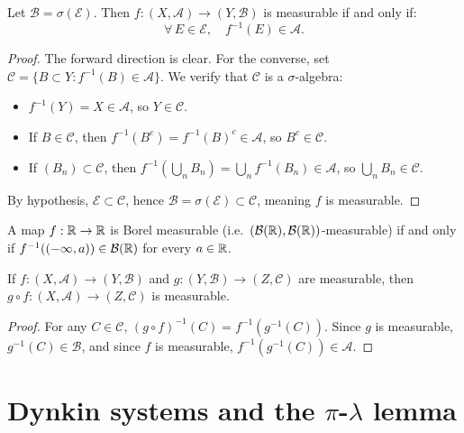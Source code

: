 \begin{proposition}
\label{prop:measurability_criterion}
Let $\mathcal{B} = \sigma(\mathcal{E})$. Then $f : (X, \mathcal{A}) \to
(Y, \mathcal{B})$ is measurable if and only if:
\[
\forall\, E \in \mathcal{E}, \quad f^{-1}(E) \in \mathcal{A}.
\]
\end{proposition}

\begin{proof}
The forward direction is clear. For the converse, set
$\mathcal{C} = \{B \subset Y : f^{-1}(B) \in \mathcal{A}\}$.
We verify that $\mathcal{C}$ is a $\sigma$-algebra:
\begin{itemize}
    \item $f^{-1}(Y) = X \in \mathcal{A}$, so $Y \in \mathcal{C}$.
    \item If $B \in \mathcal{C}$, then $f^{-1}(B^c) = f^{-1}(B)^c \in \mathcal{A}$,
    so $B^c \in \mathcal{C}$.
    \item If $(B_n) \subset \mathcal{C}$, then
    $f^{-1}(\bigcup_n B_n) = \bigcup_n f^{-1}(B_n) \in \mathcal{A}$, so
    $\bigcup_n B_n \in \mathcal{C}$.
\end{itemize}
By hypothesis, $\mathcal{E} \subset \mathcal{C}$, hence
$\mathcal{B} = \sigma(\mathcal{E}) \subset \mathcal{C}$, meaning $f$ is measurable.
\end{proof}

\begin{corollary}
A map $f : \mathbb{R} \to \mathbb{R}$ is Borel measurable (i.e.\
$(\mathcal{B}(\mathbb{R}), \mathcal{B}(\mathbb{R}))$-measurable) if and only if
$f^{-1}((-\infty, a)) \in \mathcal{B}(\mathbb{R})$ for every $a \in \mathbb{R}$.
\end{corollary}

\begin{proposition}[Composition]
If $f : (X, \mathcal{A}) \to (Y, \mathcal{B})$ and
$g : (Y, \mathcal{B}) \to (Z, \mathcal{C})$ are measurable, then
$g \circ f : (X, \mathcal{A}) \to (Z, \mathcal{C})$ is measurable.
\end{proposition}

\begin{proof}
For any $C \in \mathcal{C}$, $(g \circ f)^{-1}(C) = f^{-1}(g^{-1}(C))$. Since $g$
is measurable, $g^{-1}(C) \in \mathcal{B}$, and since $f$ is measurable,
$f^{-1}(g^{-1}(C)) \in \mathcal{A}$.
\end{proof}

\section{Dynkin systems and the $\pi$-$\lambda$ lemma}

